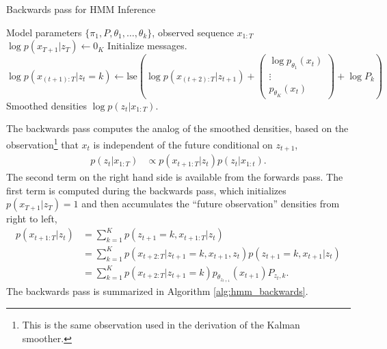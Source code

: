 \begin{algorithm}
  \begin{algorithmic}
   \caption{Backwards pass for HMM Inference}
   \label{alg:hmm_backwards}
    Model parameters $\{\pi_{1}, P, \theta_1, \dots, \theta_k\}$, observed sequence $x_{1:T}$
   \STATE $\log p\left(x_{T + 1} \vert z_T\right) \leftarrow 0_{K}$ \hfill Initialize messages.
   \STATE $\log p\left(x_{\left(t + 1\right): T} \vert z_{t} = k\right) \leftarrow \text{lse}\left(\log p\left(x_{\left(t + 2\right):T} \vert z_{t + 1}\right) + \begin{pmatrix} \log p_{\theta_{1}}\left(x_{t}\right) \\ \vdots \\ p_{\theta_{K}}\left(x_t\right)\end{pmatrix} + \log P_{k}\right)$
   \ENDFOR
   \ENDFOR
    Smoothed densities $\log p\left(z_{t} \vert x_{1:T}\right)$.
  \end{algorithmic}
\end{algorithm}

The backwards pass computes the analog of the smoothed densities, based on the
observation\footnote{This is the same observation used in the derivation of the
  Kalman smoother.} that $x_{t}$ is independent of the future conditional on
$z_{t + 1}$,
\begin{align*}
  p\left(z_{t} \vert x_{1:T}\right) &\propto p\left(x_{t + 1:T} \vert z_{t}\right) p\left(z_{t} \vert x_{1:t}\right).
\end{align*}
The second term on the right hand side is available from the forwards pass. The
first term is computed during the backwards pass, which initializes $p\left(x_{T
  + 1} \vert z_{T}\right) = 1$ and then accumulates the ``future observation''
densities from right to left,
\begin{align*}
  p\left(x_{t + 1: T} \vert z_{t}\right) &= \sum_{k = 1}^{K} p\left(z_{t + 1} = k, x_{t + 1 : T} \vert z_{t}\right) \\
  &= \sum_{k = 1}^{K} p\left(x_{t + 2: T}\vert z_{t + 1} = k, x_{t + 1}, z_{t}\right) p\left(z_{t + 1} = k, x_{t + 1} \vert z_{t}\right) \\
  &= \sum_{k = 1}^{K} p\left(x_{t + 2:T}\vert z_{t + 1} = k\right)p_{\theta_{z_{t + 1}}}\left(x_{t + 1}\right) P_{z_{t}, k}.
\end{align*}
The backwards pass is summarized in Algorithm \ref{alg:hmm_backwards}.


